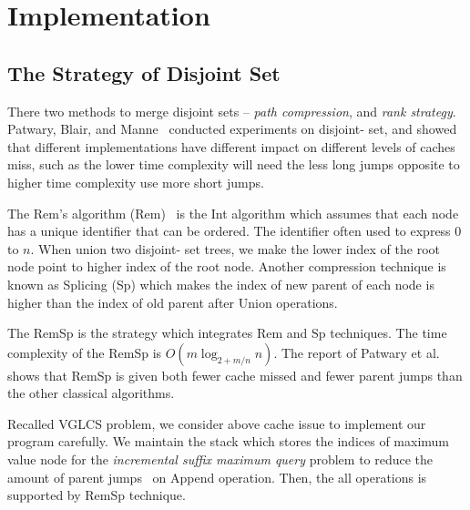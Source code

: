 \section{Implementation}
\label{sec:Implementation}

\subsection{The Strategy of Disjoint Set}

There two methods to merge disjoint sets -- {\em path compression}, and
{\em rank strategy}.  Patwary, Blair, and
Manne~\cite{Patwary2010ExperimentsOU} conducted experiments on disjoint-
set, and showed that different implementations have different impact on
different levels of caches miss, such as the lower time complexity will
need the less long jumps opposite to higher time complexity use more
short jumps. %


The Rem's algorithm ({\sc Rem})~\cite{dijkstra1976a} is the {\sc Int}
algorithm which assumes that each node has a unique identifier that can
be ordered.  The identifier often used to express $0$ to $n$.  When
union two disjoint- set trees, we make the lower index of the root node
point to higher index of the root node. Another compression technique is
known as {\sc Splicing} ({\sc Sp}) which makes the index of new parent
of each node is higher than the index of old parent after {\sc Union}
operations.

The {\sc RemSp} is the strategy which integrates {\sc Rem} and {\sc Sp}
techniques.  The time complexity of the {\sc RemSp} is $O(m \log_{2+m/n}
n)$.  The report of Patwary et al.~\cite{Patwary2010ExperimentsOU} shows
that {\sc RemSp} is given both fewer cache missed and fewer parent jumps
than the other classical algorithms.

Recalled VGLCS problem, we consider above cache issue to implement our
program carefully.  We maintain the stack which stores the indices of
maximum value node for the {\em incremental suffix maximum query}
problem to reduce the amount of parent jumps~\cite{Peng2011TheLC} on {\sc
Append} operation.  Then, the all operations is supported by {\sc RemSp}
technique.

\iffalse
運行 VGLCS 時，將耗費 $\theta(n^2)$ 的內存空間。使用遞增後綴最大值 (ISMQ) 時，
採用並查集實作將會遭遇到很多不平衡的工作負載，其原因在於合併的策略，
常見的有路徑壓縮和啟發式合併兩種策略，這間接影響到不同次數的分枝判斷。
實務上須考慮到快取未中
\fi

